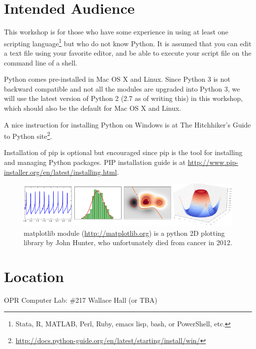 \documentclass{tufte-handout}
\begin{document}
\section{Intended Audience}\label{sec:intended_audience}
This workshop is for those who have some experience in using at least
one scripting language\footnote{Stata, R, MATLAB, Perl, Ruby, emacs
lisp, bash, or PowerShell, etc.} but who do not know Python. It is
assumed that you can edit a text file using your favorite editor, and be
able to execute your script file on the command line of a shell.

Python comes pre-installed in Mac OS X and Linux. Since Python 3 is not
backward compatible and not all the modules are upgraded into Python 3,
we will use the latest version of Python 2 (2.7 as of writing this) in
this workshop, which should also be the default for Mac OS X and Linux.

A nice instruction for installing Python on Windows is at The
Hitchhiker's Guide to Python
site\footnote{\url{http://docs.python-guide.org/en/latest/starting/install/win/}}.

Installation of pip is optional but encouraged since pip is the tool for
installing and managing Python packages. PIP installation guide is
at \url{http://www.pip-installer.org/en/latest/installing.html}.

\begin{figure}[h]
  \includegraphics[width=0.8\linewidth]{matplotlib.png}%
  \caption{matplotlib module (\url{http://matplotlib.org}) is a python 2D
    plotting library by John Hunter, who unfortunately died from cancer in 2012.}%
  \label{fig:Matplotlib Plot Examples}%
\end{figure}

\section{Location}\label{sec:location}
OPR Computer Lab: \#217 Wallace Hall (or TBA)
\end{document}
